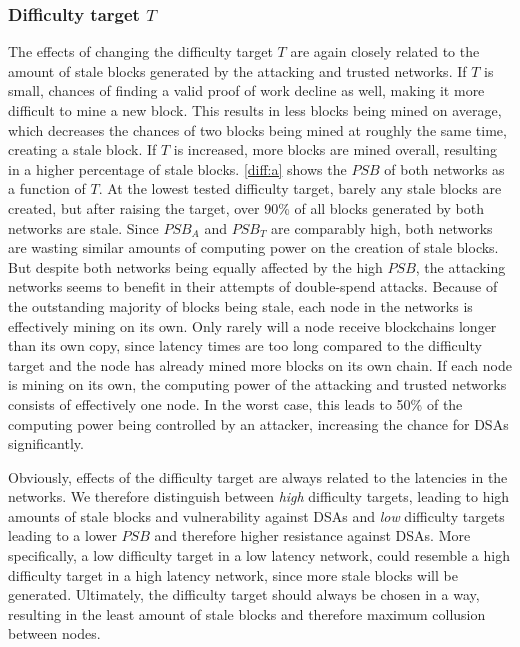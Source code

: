 \documentclass[a4paper,12pt,twoside]{report}
\begin{document}
\subsubsection{Difficulty target $T$}
The effects of changing the difficulty target $T$ are again closely related to the amount of stale blocks generated by the attacking and trusted networks. If $T$ is small, chances of finding a valid proof of work decline as well, making it more difficult to mine a new block. This results in less blocks being mined on average, which decreases the chances of two blocks being mined at roughly the same time, creating a stale block. If $T$ is increased, more blocks are mined overall, resulting in a higher percentage of stale blocks. \autoref{diff:a} shows the $PSB$ of both networks as a function of $T$. At the lowest tested difficulty target, barely any stale blocks are created, but after raising the target, over 90\% of all blocks generated by both networks are stale. Since $PSB_A$ and $PSB_T$ are comparably high, both networks are wasting similar amounts of computing power on the creation of stale blocks. But despite both networks being equally affected by the high $PSB$, the attacking networks seems to benefit in their attempts of double-spend attacks. Because of the outstanding majority of blocks being stale, each node in the networks is effectively mining on its own. Only rarely will a node receive blockchains longer than its own copy, since latency times are too long compared to the difficulty target and the node has already mined more blocks on its own chain. If each node is mining on its own, the computing power of the attacking and trusted networks consists of effectively one node. In the worst case, this leads to 50\% of the computing power being controlled by an attacker, increasing the chance for DSAs significantly.

Obviously, effects of the difficulty target are always related to the latencies in the networks. We therefore distinguish between \textit{high} difficulty targets, leading to high amounts of stale blocks and vulnerability against DSAs and \textit{low} difficulty targets leading to a lower $PSB$ and therefore higher resistance against DSAs. More specifically, a low difficulty target in a low latency network, could resemble a high difficulty target in a high latency network, since more stale blocks will be generated. Ultimately, the difficulty target should always be chosen in a way, resulting in the least amount of stale blocks and therefore maximum collusion between nodes.
\end{document}
